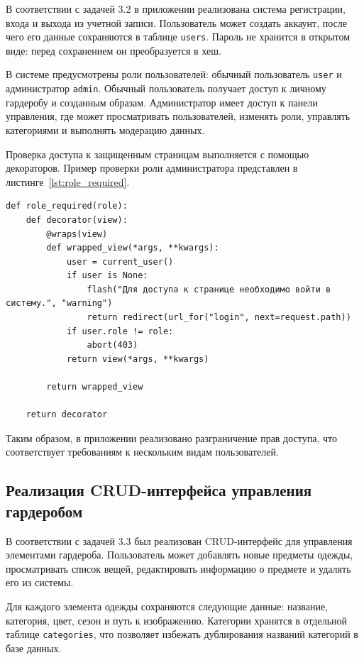 В соответствии с задачей 3.2 в приложении реализована система регистрации, входа и выхода из учетной записи. Пользователь может создать аккаунт, после чего его данные сохраняются в таблице \texttt{users}. Пароль не хранится в открытом виде: перед сохранением он преобразуется в хеш.

В системе предусмотрены роли пользователей: обычный пользователь \texttt{user} и администратор \texttt{admin}. Обычный пользователь получает доступ к личному гардеробу и созданным образам. Администратор имеет доступ к панели управления, где может просматривать пользователей, изменять роли, управлять категориями и выполнять модерацию данных.

Проверка доступа к защищенным страницам выполняется с помощью декораторов. Пример проверки роли администратора представлен в листинге~\ref{lst:role_required}.

\begin{lstlisting}[caption={Проверка роли пользователя}, label={lst:role_required}]
def role_required(role):
    def decorator(view):
        @wraps(view)
        def wrapped_view(*args, **kwargs):
            user = current_user()
            if user is None:
                flash("Для доступа к странице необходимо войти в систему.", "warning")
                return redirect(url_for("login", next=request.path))
            if user.role != role:
                abort(403)
            return view(*args, **kwargs)

        return wrapped_view

    return decorator
\end{lstlisting}

Таким образом, в приложении реализовано разграничение прав доступа, что соответствует требованиям к нескольким видам пользователей.

\subsection{Реализация CRUD-интерфейса управления гардеробом}

В соответствии с задачей 3.3 был реализован CRUD-интерфейс для управления элементами гардероба. Пользователь может добавлять новые предметы одежды, просматривать список вещей, редактировать информацию о предмете и удалять его из системы.

Для каждого элемента одежды сохраняются следующие данные: название, категория, цвет, сезон и путь к изображению. Категории хранятся в отдельной таблице \texttt{categories}, что позволяет избежать дублирования названий категорий в базе данных.


